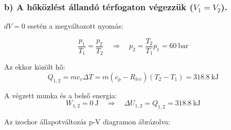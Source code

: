 \subsubsection{b) A hőközlést állandó térfogaton végezzük ($ V_1=V_2 $).}
\vspace{2mm}
\noindent $dV = 0 $ esetén a megváltozott nyomás:

\begin{equation}
\dfrac{p_1}{T_1}=\dfrac{p_2}{T_2}
\quad
\Rightarrow
\quad
p_2=\dfrac{T_2}{T_1}p_1=\SI{60}{\bar}
\end{equation}

\noindent Az ekkor közölt hő:
\begin{equation}
Q_{1,2}=m c_v \Delta T=m \left(c_p-R_{lev}\right) \left(T_2-T_1 \right)=\SI{318,8}{\kilo\joule}
\end{equation}

\noindent A végzett munka és a belső energia:
\begin{equation}
W_{1,2}=\SI{0}{\joule}
\quad
\Rightarrow
\quad
\Delta U_{1,2}= Q_{1,2}=\SI{318,8}{\kilo\joule}
\end{equation}

\pagebreak

\noindent Az izochor állapotváltozás p-V diagramon ábrázolva:

